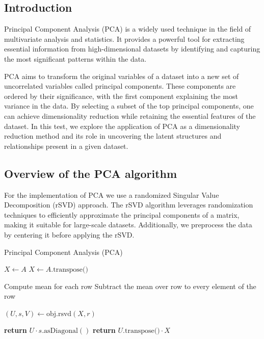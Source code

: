 \documentclass{article}
\begin{document}
\subsection{Introduction}
Principal Component Analysis (PCA) is a widely used technique in the field of multivariate analysis and statistics. It provides a powerful tool for extracting essential information from high-dimensional datasets by identifying and capturing the most significant patterns within the data.

PCA aims to transform the original variables of a dataset into a new set of uncorrelated variables called principal components. These components are ordered by their significance, with the first component explaining the most variance in the data. By selecting a subset of the top principal components, one can achieve dimensionality reduction while retaining the essential features of the dataset. In this test, we explore the application of PCA as a dimensionality reduction method and its role in uncovering the latent structures and relationships present in a given dataset.

\subsection{Overview of the PCA algorithm}
For the implementation of PCA we use a randomized Singular Value Decomposition (rSVD) approach. The rSVD algorithm leverages randomization techniques to efficiently approximate the principal components of a matrix, making it suitable for large-scale datasets. Additionally, we preprocess the data by centering it before applying the rSVD. 

\begin{algorithm}
\caption{Principal Component Analysis (PCA)}
\begin{algorithmic}[1]
    
        \State $X \gets A$
    \Else
        \State $X \gets A.\text{transpose()}$
    \EndIf

        \State Compute mean for each row
        \State Subtract the mean over row to every element of the row
    \EndFor

    \State $(U, s, V) \gets \text{obj.rsvd}(X, r)$

            \State \textbf{return} $U \cdot s.\text{asDiagonal}()$
    \Else {}
        \State \textbf{return} $U.\text{transpose()} \cdot X$
    \EndIf
\EndFunction
\end{algorithmic}
\end{algorithm}
\end{document}
